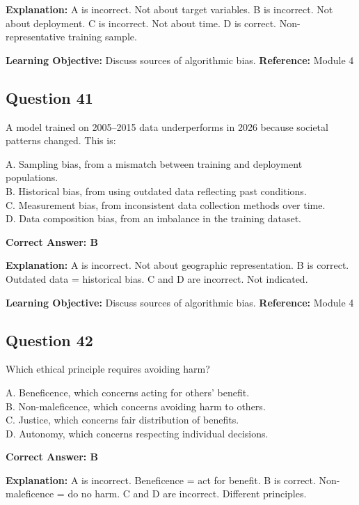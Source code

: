 \documentclass[11pt]{article}
\begin{document}
	\textbf{Explanation:}
	A is incorrect. Not about target variables.
	B is incorrect. Not about deployment.
	C is incorrect. Not about time.
	D is correct. Non-representative training sample.
	
	\textbf{Learning Objective:} Discuss sources of algorithmic bias.
	\textbf{Reference:} Module 4
	
	\subsection*{Question 41}
	A model trained on 2005--2015 data underperforms in 2026 because
	societal patterns changed. This is:
	
	A. Sampling bias, from a mismatch between training and deployment populations.\\
	B. Historical bias, from using outdated data reflecting past conditions.\\
	C. Measurement bias, from inconsistent data collection methods over time.\\
	D. Data composition bias, from an imbalance in the training dataset.
	
	\vspace{0.4em}
	\textbf{Correct Answer: B}
	
	\textbf{Explanation:}
	A is incorrect. Not about geographic representation.
	B is correct. Outdated data = historical bias.
	C and D are incorrect. Not indicated.
	
	\textbf{Learning Objective:} Discuss sources of algorithmic bias.
	\textbf{Reference:} Module 4
	
	\subsection*{Question 42}
	Which ethical principle requires avoiding harm?
	
	A. Beneficence, which concerns acting for others' benefit.\\
	B. Non-maleficence, which concerns avoiding harm to others.\\
	C. Justice, which concerns fair distribution of benefits.\\
	D. Autonomy, which concerns respecting individual decisions.
	
	\vspace{0.4em}
	\textbf{Correct Answer: B}
	
	\textbf{Explanation:}
	A is incorrect. Beneficence = act for benefit.
	B is correct. Non-maleficence = do no harm.
	C and D are incorrect. Different principles.
	
\end{document}
